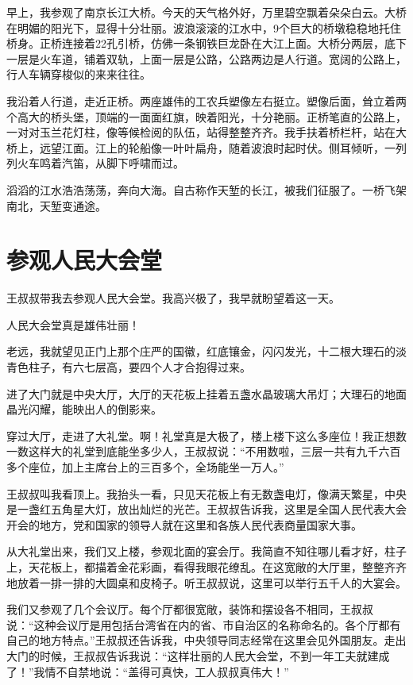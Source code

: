 \documentclass[12pt,UTF-8,openany]{ctexbook}
\begin{document}
\begin{large}
    
    早上，我参观了南京长江大桥。今天的天气格外好，万里碧空飘着朵朵白云。大桥在明媚的阳光下，显得十分壮丽。波浪滚滚的江水中，9个巨大的桥墩稳稳地托住桥身。正桥连接着22孔引桥，仿佛一条钢铁巨龙卧在大江上面。大桥分两层，底下一层是火车道，铺着双轨，上面一层是公路，公路两边是人行道。宽阔的公路上，行人车辆穿梭似的来来往往。
    
    我沿着人行道，走近正桥。两座雄伟的工农兵塑像左右挺立。塑像后面，耸立着两个高大的桥头堡，顶端的一面面红旗，映着阳光，十分艳丽。正桥笔直的公路上，一对对玉兰花灯柱，像等候检阅的队伍，站得整整齐齐。我手扶着桥栏杆，站在大桥上，远望江面。江上的轮船像一叶叶扁舟，随着波浪时起时伏。侧耳倾听，一列列火车鸣着汽笛，从脚下呼啸而过。
    
    滔滔的江水浩浩荡荡，奔向大海。自古称作天堑的长江，被我们征服了。一桥飞架南北，天堑变通途。
    
\end{large}



\chapter{参观人民大会堂}

\begin{large}
    
    王叔叔带我去参观人民大会堂。我高兴极了，我早就盼望着这一天。
    
    人民大会堂真是雄伟壮丽！
    
    老远，我就望见正门上那个庄严的国徽，红底镶金，闪闪发光，十二根大理石的淡青色柱子，有六七层高，要四个人才合抱得过来。
    
    进了大门就是中央大厅，大厅的天花板上挂着五盏水晶玻璃大吊灯；大理石的地面晶光闪耀，能映出人的倒影来。
    
    穿过大厅，走进了大礼堂。啊！礼堂真是大极了，楼上楼下这么多座位！我正想数一数这样大的礼堂到底能坐多少人，王叔叔说：“不用数啦，三层一共有九千六百多个座位，加上主席台上的三百多个，全场能坐一万人。”
    
    王叔叔叫我看顶上。我抬头一看，只见天花板上有无数盏电灯，像满天繁星，中央是一盏红五角星大灯，放出灿烂的光芒。王叔叔告诉我，这里是全国人民代表大会开会的地方，党和国家的领导人就在这里和各族人民代表商量国家大事。
    
    从大礼堂出来，我们又上楼，参观北面的宴会厅。我简直不知往哪儿看才好，柱子上，天花板上，都描着金花彩画，看得我眼花缭乱。在这宽敞的大厅里，整整齐齐地放着一排一排的大圆桌和皮椅子。听王叔叔说，这里可以举行五千人的大宴会。
    
    我们又参观了几个会议厅。每个厅都很宽敞，装饰和摆设各不相同，王叔叔说：“这种会议厅是用包括台湾省在内的省、市自治区的名称命名的。各个厅都有自己的地方特点。”王叔叔还告诉我，中央领导同志经常在这里会见外国朋友。走出大门的时候，王叔叔告诉我说：“这样壮丽的人民大会堂，不到一年工夫就建成了！”我情不自禁地说：“盖得可真快，工人叔叔真伟大！”
    
\end{large}
\end{document}
